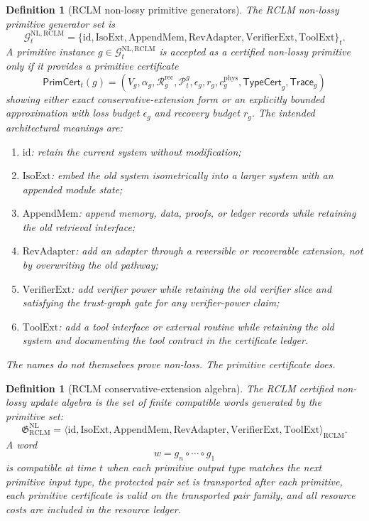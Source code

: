\documentclass[11pt,a4paper]{article}
\newtheorem{definition}[theorem]{Definition}
\newcommand{\Pcal}{\mathcal P}
\newcommand{\id}{\mathrm{id}}
\newcommand{\RCLM}{\mathrm{RCLM}}
\newcommand{\rec}{\mathrm{rec}}
\newcommand{\phys}{\mathrm{phys}}
\newcommand{\NL}{\mathrm{NL}}
\newcommand{\IsoExt}{\mathrm{IsoExt}}
\newcommand{\AppendMem}{\mathrm{AppendMem}}
\newcommand{\RevAdapter}{\mathrm{RevAdapter}}
\newcommand{\VerifierExt}{\mathrm{VerifierExt}}
\newcommand{\ToolExt}{\mathrm{ToolExt}}
\begin{document}
\begin{definition}[RCLM non-lossy primitive generators]
\label{def:rclm-non-lossy-primitive-generators}
The RCLM non-lossy primitive generator set is
\[
\mathcal G_t^{\NL,\RCLM}=
\{\id,\IsoExt,\AppendMem,\RevAdapter,\VerifierExt,\ToolExt\}_t.
\]
A primitive instance \(g\in\mathcal G_t^{\NL,\RCLM}\) is accepted as a certified non-lossy primitive only if it provides a primitive certificate
\[
\mathsf{PrimCert}_t(g)=(V_g,\alpha_g,\mathcal R_g^{\rec},\Pcal_t^{g},\epsilon_g,r_g,c_g^{\phys},\mathsf{TypeCert}_g,\mathsf{Trace}_g)
\]
showing either exact conservative-extension form or an explicitly bounded approximation with loss budget \(\epsilon_g\) and recovery budget \(r_g\).  The intended architectural meanings are:
\begin{enumerate}[label=(\alph*),leftmargin=1.5em]
    \item \(\id\): retain the current system without modification;
    \item \(\IsoExt\): embed the old system isometrically into a larger system with an appended module state;
    \item \(\AppendMem\): append memory, data, proofs, or ledger records while retaining the old retrieval interface;
    \item \(\RevAdapter\): add an adapter through a reversible or recoverable extension, not by overwriting the old pathway;
    \item \(\VerifierExt\): add verifier power while retaining the old verifier slice and satisfying the trust-graph gate for any verifier-power claim;
    \item \(\ToolExt\): add a tool interface or external routine while retaining the old system and documenting the tool contract in the certificate ledger.
\end{enumerate}
The names do not themselves prove non-loss.  The primitive certificate does.
\end{definition}

\begin{definition}[RCLM conservative-extension algebra]
\label{def:rclm-conservative-extension-algebra}
The RCLM certified non-lossy update algebra is the set of finite compatible words generated by the primitive set:
\[
\boxed{
\mathfrak G_{\RCLM}^{\NL}
=
\langle \id,\IsoExt,\AppendMem,\RevAdapter,\VerifierExt,\ToolExt\rangle_{\RCLM}.
}
\]
A word
\[
w=g_n\circ\cdots\circ g_1
\]
is compatible at time \(t\) when each primitive output type matches the next primitive input type, the protected pair set is transported after each primitive, each primitive certificate is valid on the transported pair family, and all resource costs are included in the resource ledger.
\end{definition}
\end{document}
